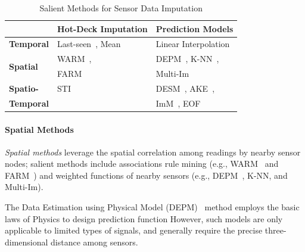 
\begin{table}
\caption{Salient Methods for Sensor Data Imputation}
\label{tbl:methods}
\centering
{\small
\begin{tabular}{|l|l|l|} \hline
   &{\bf Hot-Deck Imputation}&{\bf Prediction Models}\\ \hline
{\bf Temporal} & Last-seen~\cite{Granger:lastseen}, Mean& Linear Interpolation\\ \hline
\multirow{2}{*}{\bf Spatial}& WARM~\cite{le2005estimating},& DEPM~\cite{li2008data}, K-NN~\cite{pan2010k},\\ 
&FARM~\cite{Gruenwald:FARM}&Multi-Im~\cite{yuan2000multiple}\\\hline
{\bf Spatio-}&STI~\cite{Jian-Zhong:STI}&DESM~\cite{li2008data}, AKE~\cite{pan2010k},\\
{\bf Temporal}&&ImM~\cite{Lim:robust}, EOF~\cite{beckers2003eof} \\\hline \end{tabular}
}
\vspace{-0.1in}
\end{table}

\paragraph{Spatial Methods}
{\em Spatial methods} leverage the spatial correlation among readings
by nearby sensor nodes; salient methods include associations rule
mining (e.g., WARM~\cite{le2005estimating} and
FARM~\cite{Gruenwald:FARM}) 
and weighted functions of nearby sensors (e.g., DEPM~\cite{li2008data},
K-NN\cite{pan2010k}, and Multi-Im\cite{yuan2000multiple}).

The Data Estimation using Physical Model (DEPM)~\cite{li2008data} method employs the basic laws of Physics to 
design prediction function %
However, such models are only applicable to limited types of signals, and generally require the precise three-dimensional distance among sensors.

